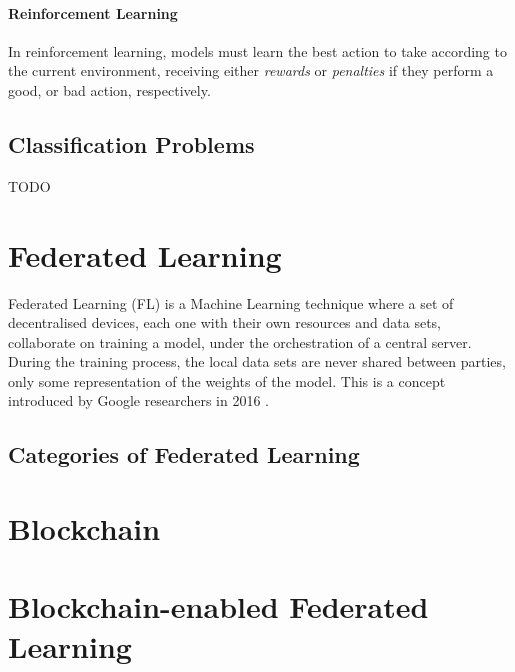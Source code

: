 \paragraph{Reinforcement Learning} In reinforcement learning, models must learn the best action to take according to the current environment, receiving either \textit{rewards} or \textit{penalties} if they perform a good, or bad action, respectively.

\subsection{Classification Problems}

TODO

\section{Federated Learning}

Federated Learning (FL) is a Machine Learning technique where a set of decentralised devices, each one with their own resources and data sets, collaborate on training a model, under the orchestration of a central server. During the training process, the local data sets are never shared between parties, only some representation of the weights of the model. This is a concept introduced by Google researchers in 2016 \cite{10.48550/arxiv.1602.05629}.

\subsection{Categories of Federated Learning}

\section{Blockchain}

\cite{nakamoto2009bitcoin}

    
    
\section{Blockchain-enabled Federated Learning}